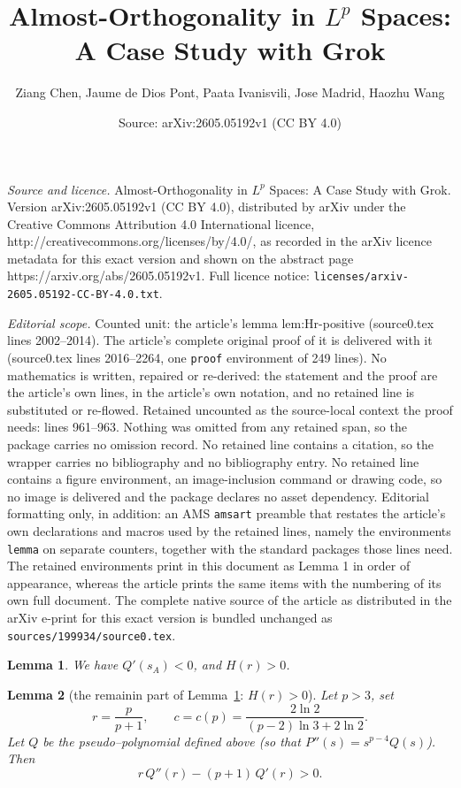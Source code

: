 \documentclass[10pt,a4paper]{amsart}
\title{Almost-Orthogonality in \texorpdfstring{$L^p$}{Lp} Spaces: A Case Study with Grok}
\author{Ziang Chen, Jaume de Dios Pont, Paata Ivanisvili, Jose Madrid, Haozhu Wang}
\date{Source: arXiv:2605.05192v1 (CC BY 4.0)}
\newtheorem{lemma}{Lemma}
\begin{document}
\maketitle

\noindent\emph{Source and licence.} Almost-Orthogonality in \texorpdfstring{$L^p$}{Lp} Spaces: A Case Study with Grok. Version arXiv:2605.05192v1 (CC BY 4.0), distributed by arXiv under the Creative Commons Attribution 4.0 International licence, http://creativecommons.org/licenses/by/4.0/, as recorded in the arXiv licence metadata for this exact version and shown on the abstract page https://arxiv.org/abs/2605.05192v1. Full licence notice: \texttt{licenses/arxiv-2605.05192-CC-BY-4.0.txt}.\par\smallskip

\noindent\textit{Editorial scope.} Counted unit: the article's lemma lem:Hr-positive (source0.tex lines 2002--2014). The article's complete original proof of it is delivered with it (source0.tex lines 2016--2264, one \texttt{proof} environment of 249 lines). No mathematics is written, repaired or re-derived: the statement and the proof are the article's own lines, in the article's own notation, and no retained line is substituted or re-flowed.  Retained uncounted as the source-local context the proof needs: lines 961--963.  Nothing was omitted from any retained span, so the package carries no omission record.  No retained line contains a citation, so the wrapper carries no bibliography and no bibliography entry.  No retained line contains a figure environment, an image-inclusion command or drawing code, so no image is delivered and the package declares no asset dependency.  Editorial formatting only, in addition: an AMS \texttt{amsart} preamble that restates the article's own declarations and macros used by the retained lines, namely the environments \texttt{lemma} on separate counters, together with the standard packages those lines need.  The retained environments print in this document as Lemma 1 in order of appearance, whereas the article prints the same items with the numbering of its own full document.  The complete native source of the article as distributed in the arXiv e-print for this exact version is bundled unchanged as \texttt{sources/199934/source0.tex}.
\begin{lemma}\label{lem: tecnichal lemma about Q'sA and Hr}
 We have $Q'(s_{A})<0$, and $H(r)>0$.  
\end{lemma}

\begin{lemma}[the remainin part of Lemma~\ref{lem: tecnichal lemma about Q'sA and Hr}: $H(r)>0$]\label{lem:Hr-positive}
Let $p>3$, set
\[
r=\frac{p}{p+1},
\qquad
c=c(p)=\frac{2\ln 2}{(p-2)\ln 3+2\ln 2}.
\]
Let $Q$ be the pseudo--polynomial defined above (so that $P''(s)=s^{p-4}Q(s)$).
Then
\[
r\,Q''(r)-(p+1)\,Q'(r)>0.
\]
\end{lemma}
\end{document}
